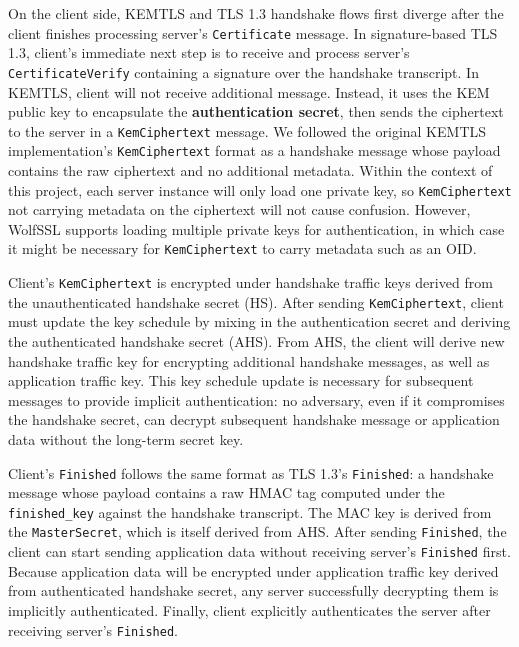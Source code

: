 \documentclass[letterpaper,12pt,titlepage,oneside,final]{book}
\begin{document}
On the client side, KEMTLS and TLS 1.3 handshake flows first diverge after the client finishes processing server's \texttt{Certificate} message. 
In signature-based TLS 1.3, client's immediate next step is to receive and process server's \texttt{CertificateVerify} containing a signature over the handshake transcript.
In KEMTLS, client will not receive additional message. Instead, it uses the KEM public key to encapsulate the \textbf{authentication secret}, then sends the ciphertext to the server in a \texttt{KemCiphertext} message.
We followed the original KEMTLS implementation's \texttt{KemCiphertext} format as a handshake message whose payload contains the raw ciphertext and no additional metadata.
Within the context of this project, each server instance will only load one private key, so \texttt{KemCiphertext} not carrying metadata on the ciphertext will not cause confusion.
However, WolfSSL supports loading multiple private keys for authentication, in which case it might be necessary for \texttt{KemCiphertext} to carry metadata such as an OID.

Client's \texttt{KemCiphertext} is encrypted under handshake traffic keys derived from the unauthenticated handshake secret (HS).
After sending \texttt{KemCiphertext}, client must update the key schedule by mixing in the authentication secret and deriving the authenticated handshake secret (AHS).
From AHS, the client will derive new handshake traffic key for encrypting additional handshake messages, as well as application traffic key.
This key schedule update is necessary for subsequent messages to provide implicit authentication: no adversary, even if it compromises the handshake secret, can decrypt subsequent handshake message or application data without the long-term secret key.

Client's \texttt{Finished} follows the same format as TLS 1.3's \texttt{Finished}: a handshake message whose payload contains a raw HMAC tag computed under the \texttt{finished\_key} against the handshake transcript. 
The MAC key is derived from the \texttt{MasterSecret}, which is itself derived from AHS. 
After sending \texttt{Finished}, the client can start sending application data without receiving server's \texttt{Finished} first.
Because application data will be encrypted under application traffic key derived from authenticated handshake secret, any server successfully decrypting them is implicitly authenticated.
Finally, client explicitly authenticates the server after receiving server's \texttt{Finished}.
\end{document}
